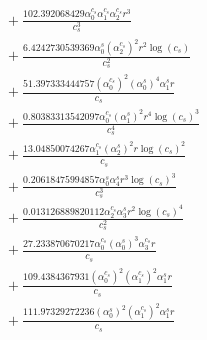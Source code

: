 \documentclass[10pt]{article}
\begin{document}
\begin{align*}
&{}  + \frac{102.392068429 \alpha_{0}^{c_s} \alpha_{1}^{c_s} \alpha_{2}^{c_s} r^{3}}{c_{s}^{3}} \\
&{}  + \frac{6.4242730539369 \alpha_{0}^s \left(\alpha_{2}^{c_s}\right)^{2} r^{2} \log{\left(c_{s} \right)}}{c_{s}^{2}} \\
&{}  + \frac{51.397333444757 \left(\alpha_{0}^{c_s}\right)^{2} \left(\alpha_{0}^s\right)^{4} \alpha_{1}^s r}{c_{s}} \\
&{}  + \frac{0.80383313542097 \alpha_{0}^{c_s} \left(\alpha_{1}^s\right)^{2} r^{4} \log{\left(c_{s} \right)}^{3}}{c_{s}^{4}} \\
&{}  + \frac{13.04850074267 \alpha_{1}^{c_s} \left(\alpha_{2}^s\right)^{2} r \log{\left(c_{s} \right)}^{2}}{c_{s}} \\
&{}  + \frac{0.20618475994857 \alpha_{0}^s \alpha_{4}^s r^{3} \log{\left(c_{s} \right)}^{3}}{c_{s}^{3}} \\
&{}  + \frac{0.013126889820112 \alpha_{2}^{c_s} \alpha_{3}^s r^{2} \log{\left(c_{s} \right)}^{4}}{c_{s}^{2}} \\
&{}  + \frac{27.233870670217 \alpha_{0}^{c_s} \left(\alpha_{0}^s\right)^{3} \alpha_{3}^{c_s} r}{c_{s}} \\
&{}  + \frac{109.4384367931 \left(\alpha_{0}^{c_s}\right)^{2} \left(\alpha_{1}^{c_s}\right)^{2} \alpha_{1}^s r}{c_{s}} \\
&{}  + \frac{111.97329272236 \left(\alpha_{0}^s\right)^{2} \left(\alpha_{1}^{c_s}\right)^{2} \alpha_{1}^s r}{c_{s}}
\end{align*}
\end{document}
